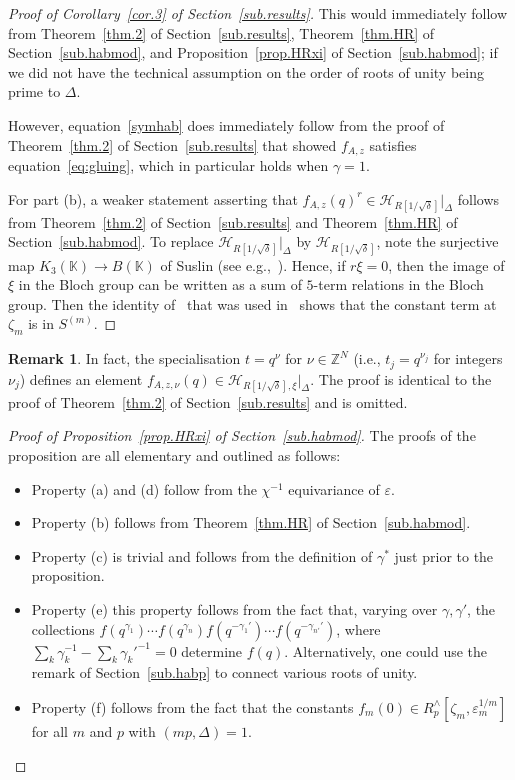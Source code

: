 \documentclass[12pt,reqno]{amsart}
\theoremstyle{definition}
\newtheorem{remark}[proposition]{Remark}
\def\BZ{\mathbb Z}
\def\BK{\mathbb K}
\def\calH{\mathcal H}
\def\ve{\varepsilon}
\def\z{\zeta}
\def\Phitof{f}
\begin{document}
\begin{proof}[Proof of Corollary~\ref{cor.3} of Section~\ref{sub.results}]
This would immediately follow from Theorem~\ref{thm.2} of Section~\ref{sub.results},
Theorem~\ref{thm.HR} of Section~\ref{sub.habmod}, and Proposition~\ref{prop.HRxi}
of Section~\ref{sub.habmod}; if we did not have the technical
assumption on the order of roots of unity being prime to $\Delta$.

However, equation~\eqref{symhab} does immediately follow from the proof of
Theorem~\ref{thm.2} of Section~\ref{sub.results} that showed $\Phitof_{A,z}$ satisfies
equation~\eqref{eq:gluing}, which in particular holds when $\gamma=1$.

For part (b), a weaker statement asserting that
$\Phitof_{A,z}(q)^{r} \in \calH_{R[1/\sqrt{\delta}]}|_\Delta$ follows from
Theorem~\ref{thm.2} of Section~\ref{sub.results} and Theorem~\ref{thm.HR} of
Section~\ref{sub.habmod}. To replace $\calH_{R[1/\sqrt{\delta}]}|_\Delta$
by $\calH_{R[1/\sqrt{\delta}]}$, note the surjective map $K_3(\BK) \to B(\BK)$
of Suslin (see e.g.,~\cite[Eqn.(1.1)]{Zickert:bloch}). Hence, if $r\xi=0$, then
the image of $\xi$ in the Bloch group can be written as a sum of $5$-term relations
in the Bloch group. Then the identity of~\cite{KMS} that was used in~\cite{CGZ}
shows that the constant term at $\z_m$ is in $S^{(m)}$.
\end{proof}

\begin{remark}
\label{rem.desc}
In fact, the specialisation $t=q^\nu$ for $\nu \in \BZ^N$ (i.e., $t_j=q^{\nu_j}$
for integers $\nu_j$) defines an element $\Phitof_{A,z,\nu}(q) \in
\calH_{R[1/\sqrt{\delta}],\xi}|_\Delta$.
The proof is identical to the proof of Theorem~\ref{thm.2} of
Section~\ref{sub.results} and is omitted.
\end{remark}

\begin{proof}[Proof of Proposition~\ref{prop.HRxi} of Section~\ref{sub.habmod}]
The proofs of the proposition are all elementary and outlined as follows:
\begin{itemize}
\item
  Property (a) and (d) follow from the $\chi^{-1}$ equivariance of $\ve$.
\item
  Property (b) follows from Theorem~\ref{thm.HR} of Section~\ref{sub.habmod}.
\item
  Property (c) is trivial and follows from the definition of $\gamma^{*}$ just prior
  to the proposition.
\item
  Property (e) this property follows from the fact that, varying over $\gamma,\gamma'$,
  the collections $f(q^{\gamma_1})\cdots f(q^{\gamma_n})f(q^{-\gamma_1'})
  \cdots f(q^{-\gamma_{n'}'})$,
  where $\sum_{k}\gamma_k^{-1}-\sum_k\gamma_{k}'^{-1}=0$ determine
  $f(q)$. Alternatively, one could use the remark
  of Section~\ref{sub.habp} to connect
  various roots of unity.
  \item Property (f) follows from the fact that the constants
  $f_m(0) \in R^\wedge_p[\z_m,\ve_m^{1/m}]$ for all $m$ and
  $p$ with $(mp,\Delta)=1$.  
\end{itemize}
\end{proof}
\end{document}
